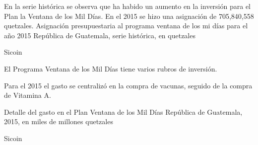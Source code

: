   
  
  {%
  	En la serie histórica se observa que ha habido un aumento en la inversión para el Plan la Ventana de los Mil Días. En el 2015 se hizo una asignación de 705,840,558 quetzales. 
  }%
  {%
  Asignación presupuestaria al programa ventana de los mi días para el año 2015} %
  {%
  	República de Guatemala, serie histórica, en quetzales} %
  {%
  	\begin{tikzpicture}[x=1pt,y=1pt]    \end{tikzpicture}}%
  {%
  	Sicoin} %
  
  
    {%
    	El Programa  Ventana de los Mil Días tiene varios rubros de inversión.
    	
    	Para el 2015 el gasto se centralizó en la compra de vacunas, seguido de la compra de Vitamina A.
    }%
    {%
    	Detalle del gasto en el Plan Ventana de los Mil Días} %
    {%
    	República de Guatemala, 2015, en miles de millones quetzales} %
    {%
    	\begin{tikzpicture}[x=1pt,y=1pt]    \end{tikzpicture}}%
    {%
    	Sicoin} %
  